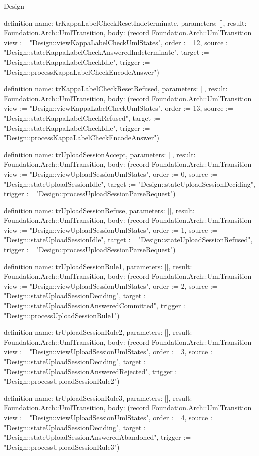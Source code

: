 \begin{lexlean}{Design}
\begin{semanticmodule}
definition{
  name: trKappaLabelCheckResetIndeterminate,
  parameters: [],
  result: Foundation.Arch::UmlTransition,
  body: (record Foundation.Arch::UmlTransition {view := "Design::viewKappaLabelCheckUmlStates", order := 12, source := "Design::stateKappaLabelCheckAnsweredIndeterminate", target := "Design::stateKappaLabelCheckIdle", trigger := "Design::processKappaLabelCheckEncodeAnswer"})
}

definition{
  name: trKappaLabelCheckResetRefused,
  parameters: [],
  result: Foundation.Arch::UmlTransition,
  body: (record Foundation.Arch::UmlTransition {view := "Design::viewKappaLabelCheckUmlStates", order := 13, source := "Design::stateKappaLabelCheckRefused", target := "Design::stateKappaLabelCheckIdle", trigger := "Design::processKappaLabelCheckEncodeAnswer"})
}

definition{
  name: trUploadSessionAccept,
  parameters: [],
  result: Foundation.Arch::UmlTransition,
  body: (record Foundation.Arch::UmlTransition {view := "Design::viewUploadSessionUmlStates", order := 0, source := "Design::stateUploadSessionIdle", target := "Design::stateUploadSessionDeciding", trigger := "Design::processUploadSessionParseRequest"})
}

definition{
  name: trUploadSessionRefuse,
  parameters: [],
  result: Foundation.Arch::UmlTransition,
  body: (record Foundation.Arch::UmlTransition {view := "Design::viewUploadSessionUmlStates", order := 1, source := "Design::stateUploadSessionIdle", target := "Design::stateUploadSessionRefused", trigger := "Design::processUploadSessionParseRequest"})
}

definition{
  name: trUploadSessionRule1,
  parameters: [],
  result: Foundation.Arch::UmlTransition,
  body: (record Foundation.Arch::UmlTransition {view := "Design::viewUploadSessionUmlStates", order := 2, source := "Design::stateUploadSessionDeciding", target := "Design::stateUploadSessionAnsweredCommitted", trigger := "Design::processUploadSessionRule1"})
}

definition{
  name: trUploadSessionRule2,
  parameters: [],
  result: Foundation.Arch::UmlTransition,
  body: (record Foundation.Arch::UmlTransition {view := "Design::viewUploadSessionUmlStates", order := 3, source := "Design::stateUploadSessionDeciding", target := "Design::stateUploadSessionAnsweredRejected", trigger := "Design::processUploadSessionRule2"})
}

definition{
  name: trUploadSessionRule3,
  parameters: [],
  result: Foundation.Arch::UmlTransition,
  body: (record Foundation.Arch::UmlTransition {view := "Design::viewUploadSessionUmlStates", order := 4, source := "Design::stateUploadSessionDeciding", target := "Design::stateUploadSessionAnsweredAbandoned", trigger := "Design::processUploadSessionRule3"})
}


\end{semanticmodule}
\end{lexlean}
